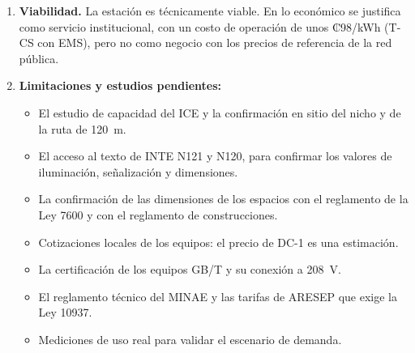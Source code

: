\begin{enumerate}
\begin{itemize}
  \item A 208~V, un EVSE de 40~A entrega 8,3~kW y no 9,6~kW.
  \item En CC, la potencia cae con el SOC: cargar del 20 al 100\,\% tarda más del doble que del 20 al 80\,\%.
  \item El límite efectivo siempre es el menor entre el vehículo, el EVSE y el suministro.
  \end{itemize}
\item \textbf{Viabilidad.} La estación es técnicamente viable. En lo económico se justifica como servicio institucional, con un costo de operación de unos ₡98/kWh (T-CS con EMS), pero no como negocio con los precios de referencia de la red pública.
\item \textbf{Limitaciones y estudios pendientes:}
  \begin{itemize}
  \item El estudio de capacidad del ICE y la confirmación en sitio del nicho y de la ruta de 120~m.
  \item El acceso al texto de INTE N121 y N120, para confirmar los valores de iluminación, señalización y dimensiones.
  \item La confirmación de las dimensiones de los espacios con el reglamento de la Ley 7600 y con el reglamento de construcciones.
  \item Cotizaciones locales de los equipos: el precio de DC-1 es una estimación.
  \item La certificación de los equipos GB/T y su conexión a 208~V.
  \item El reglamento técnico del MINAE y las tarifas de ARESEP que exige la Ley 10937.
  \item Mediciones de uso real para validar el escenario de demanda.
  \end{itemize}
\end{enumerate}
